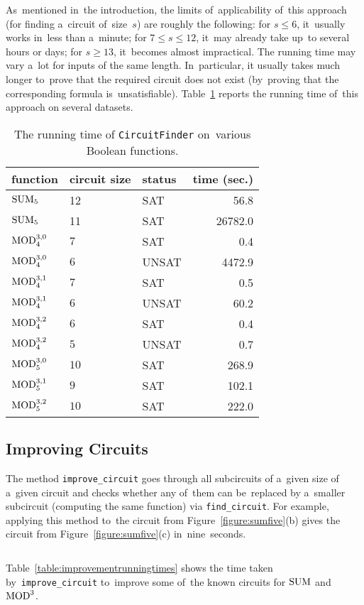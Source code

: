 As~mentioned in~the introduction, the limits
of~applicability of~this approach (for finding a~circuit
of~size~$s$) are roughly the following:
for $s \le 6$, it~usually works in~less than a~minute;
for $7 \le s \le 12$, it~may already take up~to
several hours or days; for $s \ge 13$, it~becomes almost impractical. The running time may vary a~lot
for inputs of the same length. In~particular,
it usually takes much longer to~prove that
the required circuit does not exist (by~proving that the corresponding formula is~unsatisfiable). Table~\ref{table:runningtimes} reports the running time 
of~this approach on several datasets.

\begin{table}[ht]
\begin{center}
\begin{tabular}{lllr}
\toprule
function & circuit size & status & time (sec.)\\
\midrule
$\operatorname{SUM}_5$ & 12 & SAT & 56.8\\
$\operatorname{SUM}_5$ & 11 & SAT & 26782.0\\
$\operatorname{MOD}_4^{3,0}$ & $7$ & SAT & 0.4\\
$\operatorname{MOD}_4^{3,0}$ & $6$ & UNSAT & 4472.9\\
$\operatorname{MOD}_4^{3,1}$ & $7$ & SAT & 0.5\\
$\operatorname{MOD}_4^{3,1}$ & $6$ & UNSAT & 60.2\\
$\operatorname{MOD}_4^{3,2}$ & $6$ & SAT & 0.4\\
$\operatorname{MOD}_4^{3,2}$ & $5$ & UNSAT & 0.7\\

$\operatorname{MOD}_5^{3,0}$ & $10$ & SAT & 268.9\\
$\operatorname{MOD}_5^{3,1}$ & $9$ & SAT & 102.1\\
$\operatorname{MOD}_5^{3,2}$ & $10$ & SAT & 222.0\\
\bottomrule
\end{tabular}
\end{center}
\caption{The running time of \texttt{CircuitFinder} on~various Boolean functions.} \label{table:runningtimes}
\end{table}



\subsection{Improving Circuits}
The method \texttt{improve_circuit}
goes through all subcircuits of a~given size
of a~given circuit and checks whether any
of~them can be~replaced by a~smaller subcircuit
(computing the same function) via \texttt{find_circuit}. For example, applying this method
to~the circuit from Figure~\ref{figure:sumfive}(b)
gives the circuit from Figure~\ref{figure:sumfive}(c)
in~nine~seconds.
%
\inputminted[firstline=62,lastline=67]{python}{../tutorial.py}
%
%
Table~\ref{table:improvementrunningtimes} shows the time 
taken by~\texttt{improve\_circuit} to~improve some 
of~the known circuits for $\operatorname{SUM}$ and $\operatorname{MOD}^3$. 

